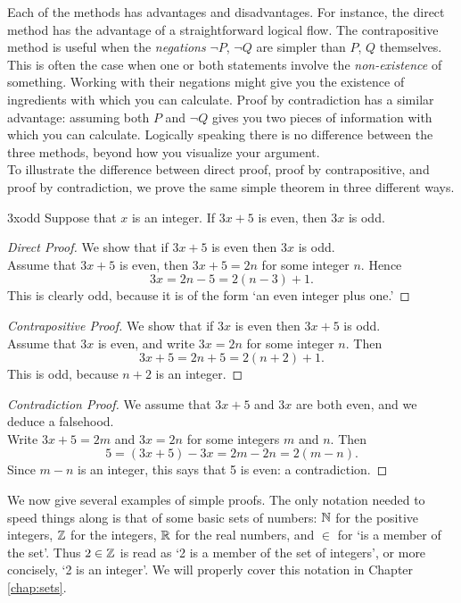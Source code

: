  Each of the methods has advantages and disadvantages. For instance, the direct method has the advantage of a straightforward logical flow. The contrapositive method is useful when the \emph{negations} $\neg P$, $\neg Q$ are simpler than $P$, $Q$ themselves. This is often the case when one or both statements involve the \emph{non-existence} of something. Working with their negations might give you the existence of ingredients with which you can calculate. Proof by contradiction has a similar advantage: assuming both $P$ and $\neg Q$ gives you two pieces of information with which you can calculate. Logically speaking there is no difference between the three methods, beyond how you visualize your argument.\\

 To illustrate the difference between direct proof, proof by contrapositive, and proof by contradiction, we prove the same simple theorem in three different ways. 


\begin{thm}{}{3xodd}
Suppose that $x$ is an integer. If $3x+5$ is even, then $3x$ is odd.
\end{thm}

\begin{proof}[Direct Proof]
We show that if $3x+5$ is even then $3x$ is odd.\\[5pt]
Assume that $3x+5$ is even, then $3x+5=2n$ for some integer $n$. Hence
\[3x=2n-5=2(n-3)+1.\]
This is clearly odd, because it is of the form `an even integer plus one.'
\end{proof}

\begin{proof}[Contrapositive Proof]
We show that if $3x$ is even then $3x+5$ is odd.\\[5pt]
Assume that $3x$ is even, and write $3x=2n$ for some integer $n$. Then
\[3x+5=2n+5=2(n+2)+1.\]
This is odd, because $n+2$ is an integer.
\end{proof}

\begin{proof}[Contradiction Proof]
We assume that $3x+5$ and $3x$ are both even, and we deduce a falsehood.\\[5pt]
Write $3x+5=2m$ and $3x=2n$ for some integers $m$ and $n$. Then
\[5=(3x+5)-3x=2m-2n=2(m-n).\]
Since $m-n$ is an integer, this says that 5 is even: a contradiction.
\end{proof}



We now give several examples of simple proofs. The only notation needed to speed things along is that of some basic sets of numbers: $\mathbb{N}$ for the positive integers, $\mathbb{Z}$ for the integers, $\mathbb{R}$ for the real numbers, and $\in$ for `is a member of the set'. Thus $2\in\mathbb{Z}$ is read as `2 is a member of the set of integers', or more concisely, `2 is an integer'. We will properly cover this notation in Chapter \ref{chap:sets}.


